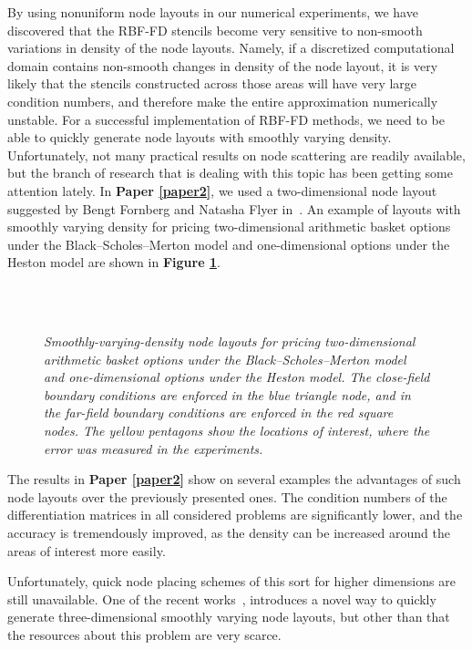 \documentclass{UUThesisTemplate}
\begin{document}
\par
By using nonuniform node layouts in our numerical experiments, we have discovered that the RBF-FD stencils become very sensitive to non-smooth variations in density of the node layouts. Namely, if a discretized computational domain contains non-smooth changes in density of the node layout, it is very likely that the stencils constructed across those areas will have very large condition numbers, and therefore make the entire approximation numerically unstable. For a successful implementation of RBF-FD methods, we need to be able to quickly generate node layouts with smoothly varying density. Unfortunately, not many practical results on node scattering are readily available, but the branch of research that is dealing with this topic has been getting some attention lately. In \textbf{Paper \ref{paper2}}, we used a two-dimensional node layout suggested by Bengt Fornberg and Natasha Flyer in~\cite{fornberg2015fast}. An example of layouts with smoothly varying density for pricing two-dimensional arithmetic basket options under the Black--Scholes--Merton model and one-dimensional options under the Heston model are shown in \textbf{Figure \ref{fig:gridsmooth}}.
\begin{figure}[H]
\centering
\\
\vspace{11pt}
\\
\caption{\emph{Smoothly-varying-density node layouts for pricing two-dimensional arithmetic basket options under the Black--Scholes--Merton model and one-dimensional options under the Heston model. The close-field boundary conditions are enforced in the blue triangle node, and in the far-field boundary conditions are enforced in the red square nodes. The yellow pentagons show the locations of interest, where the error was measured in the experiments.}}
\label{fig:gridsmooth}
\end{figure}

\par
The results in \textbf{Paper \ref{paper2}} show on several examples the advantages of such node layouts over the previously presented ones. The condition numbers of the differentiation matrices in all considered problems are significantly lower, and the accuracy is tremendously improved, as the density can be increased around the areas of interest more easily. 
\par
Unfortunately, quick node placing schemes of this sort for higher dimensions are still unavailable. One of the recent works~\cite{vlasiuk2017fast}, introduces a novel way to quickly generate three-dimensional smoothly varying node layouts, but other than that the resources about this problem are very scarce.
%
\end{document}
